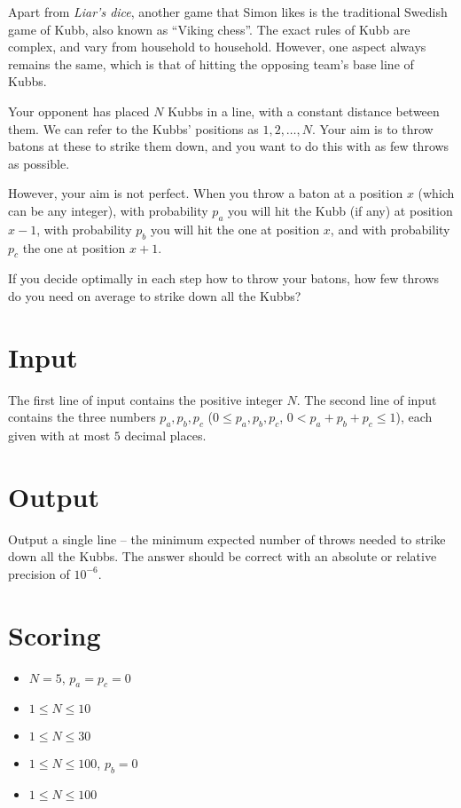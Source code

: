 Apart from \emph{Liar's dice}, another game that Simon likes is the traditional Swedish game of Kubb,
also known as ``Viking chess''.
The exact rules of Kubb are complex, and vary from household to household.
However, one aspect always remains the same, which is that of hitting the opposing team's base line of Kubbs.

Your opponent has placed $N$ Kubbs in a line, with a constant distance between them.
We can refer to the Kubbs' positions as $1, 2, \dots, N$.
Your aim is to throw batons at these to strike them down, and
you want to do this with as few throws as possible.

However, your aim is not perfect. When you throw a baton at a position $x$ (which can be any integer),
with probability $p_a$ you will hit the Kubb (if any) at position $x-1$,
with probability $p_b$ you will hit the one at position $x$, and
with probability $p_c$ the one at position $x+1$.

If you decide optimally in each step how to throw your batons,
how few throws do you need on average to strike down all the Kubbs?

\section*{Input}
The first line of input contains the positive integer $N$.
The second line of input contains the three numbers $p_a, p_b, p_c$ ($0 \le p_a, p_b, p_c$, $0 < p_a + p_b + p_c \le 1$),
each given with at most $5$ decimal places.

\section*{Output}
Output a single line -- the minimum expected number of throws needed to strike down all the Kubbs.
The answer should be correct with an absolute or relative precision of $10^{-6}$.

\section*{Scoring}
\begin{itemize}
  \item $N = 5$, $p_a = p_c = 0$
  \item $1 \le N \le 10$
  \item $1 \le N \le 30$
  \item $1 \le N \le 100$, $p_b = 0$
  \item $1 \le N \le 100$
\end{itemize}

